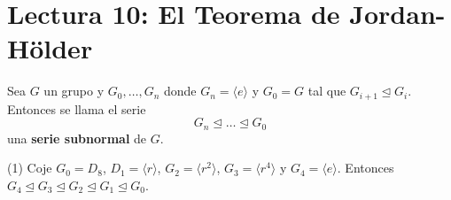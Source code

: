 \section*{Lectura 10: El Teorema de Jordan-H\"older}

\begin{definition}
    Sea $G$ un grupo y  $G_0, \dots, G_n$ donde $G_n=\langle e \rangle$ y
    $G_0=G$ tal que $G_{i+1} \unlhd G_i$. Entonces se llama el serie
    \begin{equation*}
        G_n \unlhd \dots \unlhd G_0
    \end{equation*}
    una \textbf{serie subnormal} de $G$.
\end{definition}

\begin{example}\label{}
    \item[(1)] Coje $G_0=D_8$, $D_1=\langle r \rangle$, $G_2=\langle r^2
        \rangle$, $G_3=\langle r^4 \rangle$ y $G_4=\langle e \rangle$. Entonces
        $G_4 \unlhd G_3 \unlhd G_2 \unlhd G_1 \unlhd G_0$.
\end{example}
